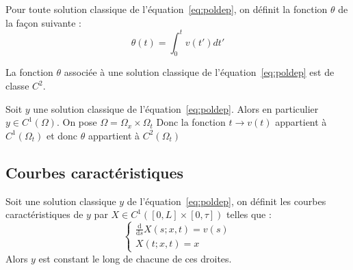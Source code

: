 \documentclass[a4paper]{article}
\begin{document}
\begin{definition} 
	Pour toute solution classique de l'équation~\eqref{eq:poldep}, on définit la fonction $\theta$ de la façon suivante : 
\begin{equation} 
	\label{def:theta}
	\theta (t) = \int_0^tv(t')dt'
\end{equation}

\end{definition}

\begin{lemme}
	La fonction $\theta$ associée à une solution classique de l'équation~\eqref{eq:poldep} est de classe $C^2$.
\end{lemme}

\begin{preuve}
	Soit $y$ une solution classique de l'équation~\eqref{eq:poldep}. Alors en particulier $y \in C^1(\Omega)$.
	On pose $\Omega = \Omega_x \times \Omega_t$ 
	Donc la fonction $t \to v(t)$ appartient à $C^1(\Omega_t)$ et donc $\theta$ appartient à $C^2(\Omega_t)$  
\end{preuve}

\subsection{Courbes caractéristiques}


\begin{definition}
	Soit une solution classique $y$ de l'équation~\eqref{eq:poldep},
	on définit les courbes caractéristiques de $y$ par $X \in C^1([0,L]\times[0,\tau])$ telles que :
	\[
	\begin{cases}
		\displaystyle \frac{\mathrm{d}}{\mathrm{d}s} X(s;x,t)= v(s)\\
		X(t;x,t) = x
	\end{cases}
	\]
	Alors $y$ est constant le long de chacune de ces droites.
\end{definition}
\end{document}
